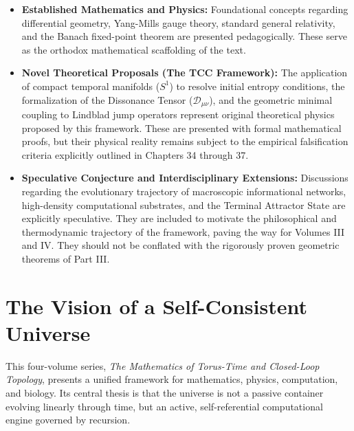 \documentclass[12pt,openany]{book}
\theoremstyle{plain}
\theoremstyle{definition}
\theoremstyle{remark}
\begin{document}
\begin{itemize}
    \item \textbf{Established Mathematics and Physics:} Foundational concepts regarding differential geometry, Yang-Mills gauge theory, standard general relativity, and the Banach fixed-point theorem are presented pedagogically. These serve as the orthodox mathematical scaffolding of the text.
    \item \textbf{Novel Theoretical Proposals (The TCC Framework):} The application of compact temporal manifolds ($S^1$) to resolve initial entropy conditions, the formalization of the Dissonance Tensor ($\mathcal{D}_{\mu\nu}$), and the geometric minimal coupling to Lindblad jump operators represent original theoretical physics proposed by this framework. These are presented with formal mathematical proofs, but their physical reality remains subject to the empirical falsification criteria explicitly outlined in Chapters 34 through 37.
    \item \textbf{Speculative Conjecture and Interdisciplinary Extensions:} Discussions regarding the evolutionary trajectory of macroscopic informational networks, high-density computational substrates, and the Terminal Attractor State are explicitly speculative. They are included to motivate the philosophical and thermodynamic trajectory of the framework, paving the way for Volumes III and IV. They should not be conflated with the rigorously proven geometric theorems of Part III.
\end{itemize}

\section{The Vision of a Self-Consistent Universe}
This four-volume series, \textit{The Mathematics of Torus-Time and Closed-Loop Topology}, 
presents a unified framework for mathematics, physics, computation, and biology. 
Its central thesis is that the universe is not a passive container evolving linearly 
through time, but an active, self-referential computational engine governed by recursion.
\end{document}

